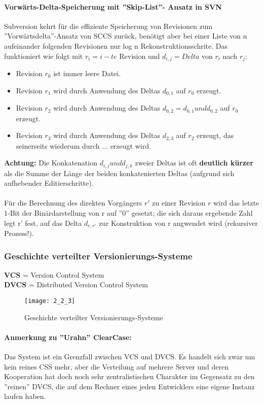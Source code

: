 \paragraph{Vorwärts-Delta-Speicherung mit ''Skip-List''- Ansatz in SVN}
Subversion kehrt für die effiziente Speicherung von Revisionen zum ''Vorwärtsdelta''-Ansatz von SCCS zurück, benötigt aber bei einer Liste von n aufeinander folgenden Revisionen nur log n Rekonstruktionsschrite. Das funktioniert wie folgt mit $r_{i} = i-te $ Revision und $d_{i,j} = Delta$ von $r_{i}$ nach $r_{j}$:
\begin{itemize}
	\item Revision $r_{0}$ ist immer leere Datei.
	\item Revision $r_{1}$ wird durch Anwendung des Deltas $d_{0,1}$ auf $r_{0}$ erzeugt.
	\item Revision $r_{2}$ wird durch Anwendung des Deltas $d_{0,2} = d_{0,1} und d_{0,2}$ auf $r_{0}$ erzeugt.
	\item Revision $r_{3}$ wird durch Anwendung des Deltas $d_{2,3}$ auf $r_{2}$ erzeugt, das seinerseits wiederum durch ... erzeugt wird.
\end{itemize}
\textbf{Achtung:} Die Konkatenation $d_{i,j} und d_{j,k}$ zweier Deltas ist oft \textbf{deutlich kürzer} als die Summe der Länge der beiden konkatenierten Deltas (aufgrund sich aufhebender Editierschritte).
\\
\\
Für die Berechnung des direkten Vorgängers $r'$ zu einer Revision $r$ wird das letzte 1-Bit der Binärdarstellung von r auf ''0'' gesetzt; die sich daraus ergebende Zahl legt r' fest, auf das Delta $d_{r,r'}$ zur Konstruktion von r angwendet wird (rekursiver Prozess!).
\subsubsection{Geschichte verteilter Versionierungs-Systeme}
\textbf{VCS} = Version Control System
\\
\textbf{DVCS} = Distributed Version Control System
\begin{figure}[h]
	\caption{Geschichte verteilter Versionierungs-Systeme}
	\centering
	\texttt{[image: 2\_2\_3]}
\end{figure}
\paragraph{Anmerkung zu ''Urahn'' ClearCase:}
Das System ist ein Grenzfall zwischen VCS und DVCS. Es handelt sich zwar um kein reines CSS mehr, aber die Verteilung auf mehrere Server und deren Kooperation hat doch noch sehr zentralistischen Charakter im Gegensatz zu den ''reinen'' DVCS, die auf dem Rechner eines jeden Entwicklers eine eigene Instanz laufen haben.
